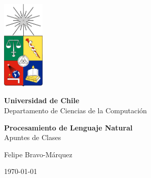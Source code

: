 \documentclass{book}
\begin{document}
\thispagestyle{empty}

\begin{titlepage}
    \begin{center}
        \vspace*{1cm}
        \includegraphics[width=2cm]{pics/escudocolor.png} %
        \vspace{1cm}
        
        {\Huge\textbf{Universidad de Chile}} \\
        \vspace{0.5cm}
        {\Large Departamento de Ciencias de la Computación} \\
        \vspace{2cm}
        
        {\Huge\textbf{Procesamiento de Lenguaje Natural}} \\
        \vspace{0.5cm}
        {\Large Apuntes de Clases} \\
        \vspace{2cm}
        
        {\Large Felipe Bravo-Márquez} \\
        \vspace{2cm}
        
        {\large \today}
    \end{center}
\end{titlepage}

\newpage

\thispagestyle{empty}

\newpage
{}

\tableofcontents 
\newpage

\listoftables
\newpage
\listoffigures
\newpage


\thispagestyle{empty}



\end{document}
